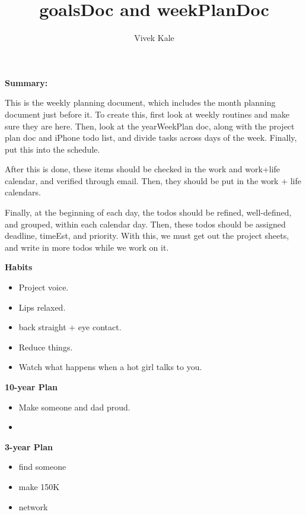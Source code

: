 \documentclass[11pt]{article}
\title{goalsDoc and weekPlanDoc}
\author{Vivek Kale}
\begin{document}
\maketitle 

\textbf{Summary:} {\small This is the weekly planning document, which includes 
the month planning document just before it. 
To create this, first look at weekly routines and make sure they are here. Then, look at the yearWeekPlan doc, along with the project plan doc and iPhone
todo list, and divide tasks across days of the week. Finally, put this
into the schedule. 

After this is done, these items should be checked in the work and
work+life calendar, and verified through email. 
Then, they should be put in the work + life
calendars.

Finally, at the beginning of each day, the todos should be refined,
well-defined, and grouped, within each calendar day. Then, these todos
should be assigned deadline, timeEst, and priority. 
With this, we must get out the project sheets, and write in more todos
while we work on it. 
}

\newpage 


\textbf{Habits}
\begin{itemize}
\item \tiny Project voice. 
\item \tiny Lips relaxed.
  \tiny \item \tiny back straight + eye contact.
\item \tiny Reduce things.
\item \tiny Watch what happens when a hot girl talks to you.
\end{itemize} 

\newpage
\textbf{10-year Plan}
\begin{itemize}
\item \small Make someone and dad proud.
\item \small 
\end{itemize}

\textbf{3-year Plan} 
\begin{itemize} 
  \small \item \small find someone
\item \small make 150K
\item \small network
\end{itemize} 
\end{document}
